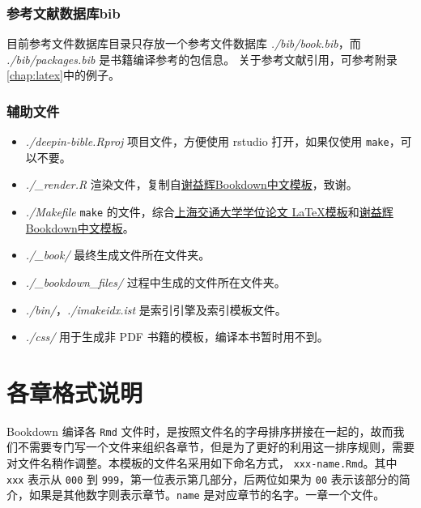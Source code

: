\documentclass[doctor,openright,twoside]{sjtuthesis}
\providecommand{\tightlist}{%
    \setlength{\itemsep}{0pt}\setlength{\parskip}{0pt}}
\newcommand{\passthrough}[1]{#1}
\theoremstyle{plain}
\theoremstyle{definition}
\theoremstyle{remark}
\theoremstyle{ocrenumbox}
\theoremstyle{plain}
\begin{document}
\hypertarget{intro:bib}{%
\subsection{参考文献数据库bib}\label{intro:bib}}

目前参考文件数据库目录只存放一个参考文件数据库 \emph{./bib/book.bib}，而
\emph{./bib/packages.bib} 是书籍编译参考的包信息。
关于参考文献引用，可参考附录\ref{chap:latex}中的例子。

\subsection{辅助文件}

\begin{itemize}
\tightlist
\item
  \emph{./deepin-bible.Rproj} 项目文件，方便使用 rstudio
  打开，如果仅使用 \passthrough{\lstinline!make!}，可以不要。
\item
  \emph{./\_render.R}
  渲染文件，复制自\href{https://github.com/yihui/bookdown-chinese}{谢益辉Bookdown中文模板}，致谢。
\item
  \emph{./Makefile} \passthrough{\lstinline!make!}
  的文件，综合\href{https://github.com/sjtug/SJTUThesis}{上海交通大学学位论文
  \LaTeX 模板}和\href{https://github.com/yihui/bookdown-chinese}{谢益辉Bookdown中文模板}。
\item
  \emph{./\_book/} 最终生成文件所在文件夹。
\item
  \emph{./\_bookdown\_files/} 过程中生成的文件所在文件夹。
\item
  \emph{./bin/}，\emph{./imakeidx.ist} 是索引引擎及索引模板文件。
\item
  \emph{./css/} 用于生成非 PDF 书籍的模板，编译本书暂时用不到。
\end{itemize}

\hypertarget{chap:chapters}{%
\chapter{各章格式说明}\label{chap:chapters}}

Bookdown 编译各 \passthrough{\lstinline!Rmd!}
文件时，是按照文件名的字母排序拼接在一起的，故而我们不需要专门写一个文件来组织各章节，但是为了更好的利用这一排序规则，需要对文件名稍作调整。本模板的文件名采用如下命名方式，
\passthrough{\lstinline!xxx-name.Rmd!}。其中
\passthrough{\lstinline!xxx!} 表示从 \passthrough{\lstinline!000!} 到
\passthrough{\lstinline!999!}，第一位表示第几部分，后两位如果为
\passthrough{\lstinline!00!}
表示该部分的简介，如果是其他数字则表示章节。\passthrough{\lstinline!name!}
是对应章节的名字。一章一个文件。
\end{document}
